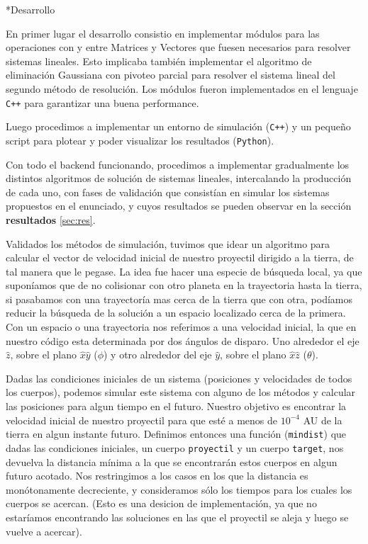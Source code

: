 \documentclass[12pt,titlepage]{article}
\newenvironment{usection}[1]{\newpage\begin{section}*{#1}	\addcontentsline{toc}{section}{#1}}{\end{section}}
\begin{document}
	\begin{usection}{Desarrollo}

		En primer lugar el desarrollo consistio en implementar módulos
		para las operaciones con y entre Matrices y Vectores que
		fuesen necesarios para resolver sistemas lineales. Esto
		implicaba también implementar el algoritmo de eliminación
		Gaussiana con pivoteo parcial para resolver el sistema lineal
		del segundo método de resolución. Los módulos fueron
		implementados en el lenguaje \texttt{C++} para garantizar una
		buena performance.

		Luego procedimos a implementar un entorno de simulación
		(\texttt{C++}) y un pequeño script para plotear y poder
		visualizar los resultados (\texttt{Python}). 

		Con todo el backend funcionando, procedimos a implementar
		gradualmente los distintos algoritmos de solución de sistemas
		lineales, intercalando la producción de cada uno, con fases de
		validación que consistían en simular los sistemas propuestos
		en el enunciado, y cuyos resultados se pueden observar en la
		sección \textbf{resultados} \ref{sec:res}.

		Validados los métodos de simulación, tuvimos que idear un
		algoritmo para calcular el vector de velocidad inicial de
		nuestro proyectil dirigido a la tierra, de tal manera que le pegase.
		La idea fue hacer una especie de búsqueda local, ya que
		suponíamos que de no colisionar con otro planeta en la
		trayectoria hasta la tierra, si pasabamos con una trayectoría
		mas cerca de la tierra que con otra, podíamos reducir la
		búsqueda de la solución a un espacio localizado cerca de la
		primera. Con un espacio o una trayectoria nos referimos a una
		velocidad inicial, la que en nuestro código esta determinada por
		dos ángulos de disparo. Uno alrededor el eje $\hat{z}$, sobre el
		plano $\hat{x}\hat{y}$ ($\phi$) y otro alrededor del eje $\hat{y}$, sobre
		el plano $\hat{x}\hat{z}$ ($\theta$).
		
		Dadas las condiciones iniciales de un sistema (posiciones y velocidades de todos los cuerpos), podemos simular este sistema con alguno de los métodos y calcular las posiciones para algun tiempo en el futuro.
		Nuestro objetivo es encontrar la velocidad inicial de nuestro proyectil para que esté a menos de $10^{-4}$ AU de la tierra en algun instante futuro.
		Definimos entonces una función (\texttt{mindist}) que dadas las condiciones iniciales, un cuerpo \texttt{proyectil} y un cuerpo \texttt{target}, nos devuelva la distancia mínima a la que se encontrarán estos cuerpos en algun futuro acotado.
		Nos restringimos a los casos en los que la distancia es monótonamente decreciente, y consideramos sólo los tiempos para los cuales los cuerpos se acercan. (Esto es una desicion de implementación, ya que no estaríamos encontrando las soluciones en las que el proyectil se aleja y luego se vuelve a acercar).
		

\end{usection}
\end{document}
